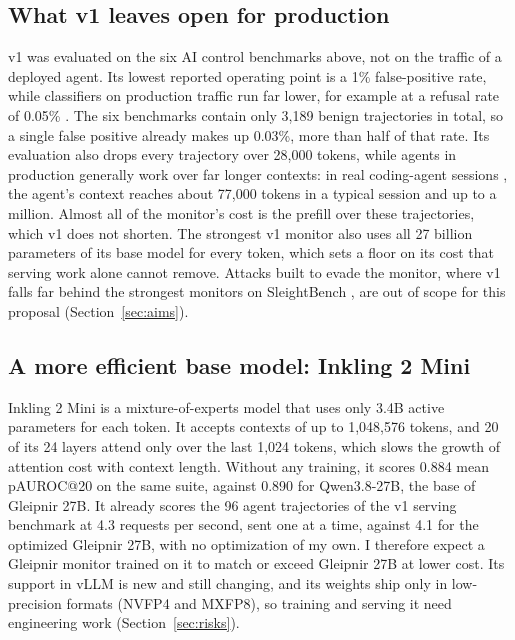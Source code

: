 \subsection{What v1 leaves open for production}
\label{sec:gaps}
v1 was evaluated on the six AI control benchmarks above, not on the traffic of
a deployed agent. Its lowest reported operating point is a 1\% false-positive
rate, while classifiers on production traffic run far lower, for example at a
refusal rate of 0.05\% \citep{cunningham2026constitutional}. The six benchmarks
contain only 3,189 benign trajectories in total, so a single false positive
already makes up 0.03\%, more than half of that rate. Its evaluation
also drops every trajectory over 28,000 tokens, while agents in production
generally work over far longer contexts: in real coding-agent sessions
\citep{baumann2026swechat}, the agent's context reaches about 77,000 tokens in
a typical session and up to a million. Almost all of the monitor's cost is the prefill over these
trajectories, which v1 does not shorten. The strongest v1 monitor also uses all 27 billion parameters of its base
model for every token, which sets a floor on its cost that serving work alone
cannot remove. Attacks built to evade the monitor, where v1 falls far behind the strongest monitors on
SleightBench \citep{najt2026sleight}, are out of scope for this proposal
(Section~\ref{sec:aims}).

\subsection{A more efficient base model: Inkling 2 Mini}
\label{sec:inkling}
Inkling 2 Mini \citep{inkling2mini} is a mixture-of-experts model that uses
only 3.4B active parameters for each token. It accepts contexts of up to 1,048,576 tokens, and 20 of
its 24 layers attend only over the last 1,024 tokens, which slows the growth
of attention cost with context length. Without any training, it scores 0.884 mean pAUROC@20 on the same suite, against 0.890 for Qwen3.8-27B, the base of Gleipnir 27B. It already scores the 96 agent trajectories of the v1 serving benchmark at 4.3
requests per second, sent one at a time, against 4.1 for the optimized
Gleipnir 27B, with no optimization of my own. I therefore expect a Gleipnir monitor trained on it to match or exceed
Gleipnir 27B at lower cost. Its support in vLLM is new and still changing, and its weights ship only in
low-precision formats (NVFP4 and MXFP8), so training and serving it need
engineering work (Section~\ref{sec:risks}).
